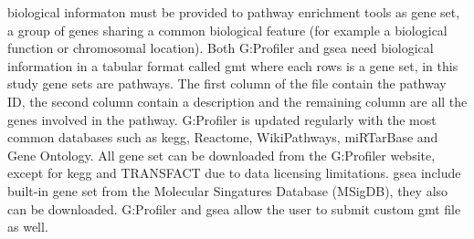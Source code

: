 biological informaton must be provided to pathway enrichment tools as gene set, a group of genes sharing a common biological feature (for example a biological function or chromosomal location).
Both G:Profiler and \acrshort{gsea} need biological information in a tabular format called \acrfull{gmt} where each rows is a gene set, in this study gene sets are pathways.
The first column of the file contain the pathway ID, the second column contain a description and the remaining column are all the genes involved in the pathway.
G:Profiler is updated regularly with the most common databases such as \acrshort{kegg}, Reactome, WikiPathways, miRTarBase and Gene Ontology.
All gene set can be downloaded from the G:Profiler website, except for \acrshort{kegg} and TRANSFACT due to data licensing limitations.
\acrshort{gsea} include built-in gene set from the Molecular Singatures Database (MSigDB), they also can be downloaded.
G:Profiler and \acrshort{gsea} allow the user to submit custom \acrshort{gmt} file as well.

